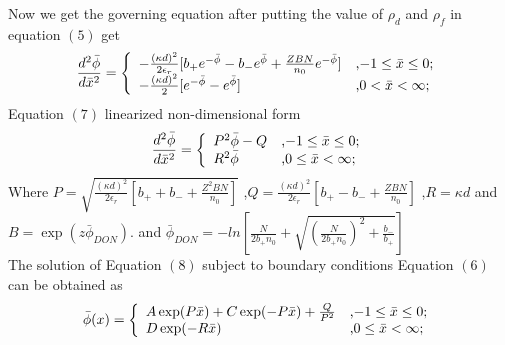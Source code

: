 \documentclass[11 pt]{article}
\begin{document}
Now we get the governing equation after putting the value of $\rho_{d}$ and $\rho_{f}$ in equation $(5)$ get \\
\begin{equation}
 \frac{d^{2}\bar\phi}{d \bar x^{2}}=\left\{
                                                                  \begin{array}{ll}
   -\frac{(\kappa d)^{2}}{2\epsilon_{r}}[b_{+}{e}^{-\bar\phi}-b_{-}{e}^{\bar\phi}+\frac{ZBN}{n_{0}}{e}^{-\bar\phi}] & \hbox{,$ -1 \leq \bar x \leq0$;} \\
     -\frac{(\kappa d)^{2}}{2}[{e}^{-\bar\phi}-{e}^{\bar\phi}] & \hbox{,$0 < \bar x <\infty$;} \\
                                                                  \end{array}
                                                                 \right.
                                                               \label{7}
\end{equation}
 Equation $(7)$ linearized non-dimensional form \\
\begin{equation}
 \frac{d^{2}\bar\phi}{d \bar x^{2}}=\left\{
                                                                  \begin{array}{ll}
                                                                 {P}^{2}\bar\phi-Q & \hbox{,$-1 \leq \bar x \leq0$;} \\
                                                                 {R}^{2}\bar\phi & \hbox{,$0 \leq  \bar x <\infty$;} \\
                                                                  \end{array}
                                                                 \right.
                                                               \label{8}
\end{equation}
Where $ P=\sqrt{\frac{(\kappa d)^{2}}{2\epsilon_{r}}[b_{+}+b_{-}+\frac{{Z}^{2}BN}{n_{0}}]}$ ,$ Q=\frac{(\kappa d)^{2}}{2\epsilon_{r}}[b_{+}-b_{-}+\frac{ZBN}{n_{0}}]$ ,$ R=\kappa d $ and $ B=\exp(z\bar\phi_{DON}) $.
and $\bar\phi_{DON}=-ln[\frac{N}{2b_{+}n_{0}}+\sqrt{{(\frac{N}{2b_{+}n_{0}})^{2}}+\frac{b_{-}}{b_{+}}}]$\\
The solution of Equation $(8)$ subject to boundary conditions Equation $(6)$ can be obtained as\\
\begin{equation}
 \bar\phi(x)=\left\{
                                                                  \begin{array}{ll}
                                                                 A\exp(P\bar x)+C\exp(-P\bar x)+\frac{Q}{{P}^{2}} & \hbox{,$-1 \leq \bar x \leq0$;} \\
                                                                 D\exp(-R\bar x) & \hbox{,$0 \leq  \bar x <\infty$;} \\
                                                                  \end{array}
                                                                 \right.
                                                               \label{9}
\end{equation}
\end{document}
